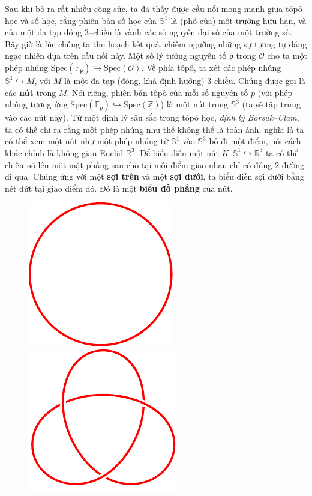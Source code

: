 \begin{multicols}{2}
	\vskip 0.1cm
	Sau khi bỏ ra rất nhiều công sức, ta đã thấy được cầu nối mong manh giữa tôpô học và số học, rằng phiên bản số học của $\mathbb{S}^1$ là (phổ của) một trường hữu hạn, và của một đa tạp đóng $3$--chiều là vành các số nguyên đại số của một trường số. Bây giờ là lúc chúng ta thu hoạch kết quả, chiêm ngưỡng những sự tương tự đáng ngạc nhiên dựa trên cầu nối này. Một số lý tưởng nguyên tố $\mathfrak{p}$ trong $\mathcal{O}$ cho ta một phép nhúng $\text{Spec}(\mathbb{F}_\mathfrak{p}) \hookrightarrow \text{Spec}(\mathcal{O})$. Về phía tôpô, ta xét các phép nhúng $\mathbb{S}^1 \hookrightarrow M$, với $M$ là một đa tạp (đóng, khả định hướng) $3$-chiều. Chúng được gọi là các {\bf\color{duongvaotoanhoc} nút} trong $M$. Nói riêng, phiên bản tôpô của mỗi số nguyên tố $p$ (với phép nhúng tương ứng $\text{Spec}(\mathbb{F}_p) \hookrightarrow \text{Spec}(\mathbb{Z})$) là một nút trong $\mathbb{S}^3$ (ta sẽ tập trung vào các nút này). Từ một định lý sâu sắc trong tôpô học, {\it định lý Borsuk--Ulam}, ta có thể chỉ ra rằng một phép nhúng như thế không thể là toàn ánh, nghĩa là ta có thể xem một nút như một phép nhúng từ $\mathbb{S}^1$ vào $\mathbb{S}^3$ bỏ đi một điểm, nói cách khác chính là không gian Euclid $\mathbb{R}^3$.
	\vskip 0.1cm
	Để biểu diễn một nút $K: \mathbb{S}^1 \hookrightarrow \mathbb{R}^3$ ta có thể chiếu nó lên một mặt phẳng sau cho tại mỗi điểm giao nhau chỉ có đúng $2$ đường đi qua. Chúng ứng với một {\bf\color{duongvaotoanhoc} sợi trên} và một {\bf\color{duongvaotoanhoc} sợi dưới}, ta biểu diễn sợi dưới bằng nét đứt tại giao điểm đó.  Đó là một {\bf\color{duongvaotoanhoc} biểu đồ phẳng} của nút.
	\begin{figure}[H]
		\vspace*{-5pt}
		\centering
		\captionsetup{labelformat= empty, justification=centering}
		\includegraphics[width= 0.28\linewidth]{unknot.pdf}\quad
		\includegraphics[width= 0.28\linewidth]{trefoil.pdf}\quad

\end{figure}
\end{multicols}
